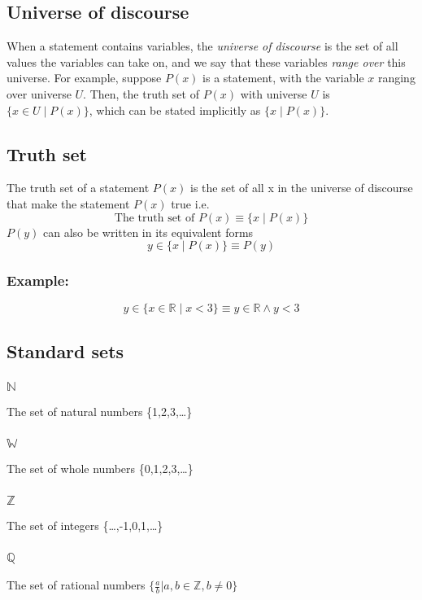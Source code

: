 \documentclass{article}
\begin{document}
\subsection{Universe of discourse}
	When a statement contains variables, the \emph{universe of discourse} is the set of all values the variables can take on, and we say that these variables \emph{range over} this universe. For example, suppose \(P(x)\) is a statement, with the variable \(x\) ranging over universe \(U\). Then, the truth set of \(P(x)\) with universe \(U\) is \(\{x\in U\mid P(x)\}\), which can be stated implicitly as \(\{x\mid P(x)\}\).
\subsection{Truth set}
The truth set of a statement \(P(x)\) is the set of all x in the universe of discourse that make the statement \(P(x)\) true i.e.
\begin{displaymath}
	\text{The truth set of } P(x) \equiv \{x\mid P(x)\}
\end{displaymath}
\(P(y)\) can also be written in its equivalent forms
\begin{displaymath}
	y\in\{x\mid P(x)\}\equiv P(y)
\end{displaymath}
\subsubsection{Example:}
\begin{displaymath}
	y\in\{x\in\mathbb{R}\mid x<3\}\equiv y\in\mathbb{R}\wedge y<3
\end{displaymath}
\subsection{Standard sets}
\subsubsection{\(\mathbb{N}\)}
The set of natural numbers \{1,2,3,\ldots\}
\subsubsection{\(\mathbb{W}\)}
The set of whole numbers \{0,1,2,3,\ldots\}
\subsubsection{\(\mathbb{Z}\)}
The set of integers \{\ldots ,-1,0,1,\ldots\}
\subsubsection{\(\mathbb{Q}\)}
The set of rational numbers \(\{\frac{a}{b}\lvert a,b\in\mathbb{Z}, b\neq 0\}\)
\end{document}
